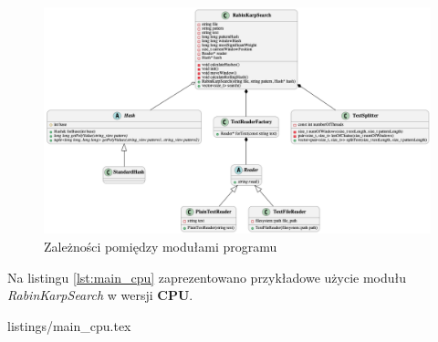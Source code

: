 \begin{figure}[H]
    \centering
    \includegraphics[width=\linewidth]{images/uml/RabinKarpSearch.png}
    \caption{Zależności pomiędzy modułami programu}
    \label{fig:rabin_karp_search}
\end{figure}
Na listingu \ref{lst:main_cpu} zaprezentowano przykładowe użycie modułu \textit{RabinKarpSearch} w wersji \textbf{CPU}. 
\begin{lstinputlisting}[language=C++, label=lst:main_cpu, caption=Przykładowe użycie modułu \textit{RabinKarpSearch} w wersji \textbf{CPU}]{listings/main_cpu.tex}
\end{lstinputlisting}

